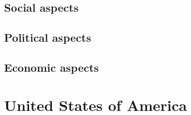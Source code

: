 \documentclass[10pt]{article}
\begin{document}
\subsection{Social aspects}
	\label{ssec:global@social}
\subsection{Political aspects}
	\label{ssec:global@political}
\subsection{Economic aspects}
	\label{ssec:global@economic}

\section{United States of America}
	\label{sec:usa}
\end{document}
